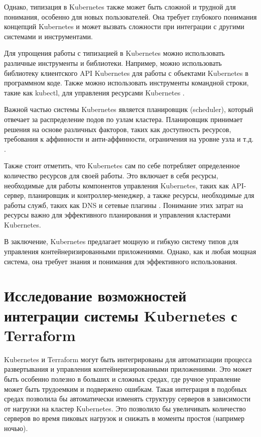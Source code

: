 Однако, типизация в Kubernetes также может быть сложной и трудной для
понимания, особенно для новых пользователей. Она требует глубокого
понимания концепций Kubernetes и может вызвать сложности при интеграции
с другими системами и инструментами.

Для упрощения работы с типизацией в Kubernetes можно использовать
различные инструменты и библиотеки. Например, можно использовать
библиотеку клиентского API \newline Kubernetes для работы с объектами Kubernetes
в программном коде. Также можно использовать инструменты командной строки,
такие как kubectl, для управления ресурсами Kubernetes \cite{kubectl}.

Важной частью системы Kubernetes является планировщик (scheduler),
который отвечает за распределение подов по узлам кластера. Планировщик
принимает решения на основе различных факторов, таких как доступность
ресурсов, требования к аффинности и анти-аффинности, ограничения на уровне
узла и т.д. \cite{carrion2022kubernetes, senjab2023survey}.

Также стоит отметить, что Kubernetes сам по себе потребляет определенное
количество ресурсов для своей работы. Это включает в себя ресурсы,
необходимые для работы компонентов управления Kubernetes, таких как
API-сервер, планировщик и контроллер-менеджер, а также ресурсы, необходимые
для работы служб, таких как DNS и сетевые плагины \cite{turin2023predicting}.
Понимание этих затрат на ресурсы важно для эффективного планирования и
управления кластерами Kubernetes.

В заключение, Kubernetes предлагает мощную и гибкую систему типов для
управления контейнеризированными приложениями. Однако, как и любая мощная
система, она требует знания и понимания для эффективного использования.

\section{Исследование возможностей интеграции системы Kubernetes с \newline
Terraform}
Kubernetes и Terraform могут быть интегрированы для автоматизации процесса
развертывания и управления контейнеризированными приложениями.
Это может быть особенно полезно в больших и сложных средах, где ручное
управление может быть трудоемким и подвержено ошибкам.
Такая интеграция в подобных средах позволила бы автоматически изменять
структуру серверов в зависимости от нагрузки на кластер Kubernetes. 
Это позволило бы увеличивать количество серверов во время пиковых нагрузок
и снижать в моменты простоя (например ночью).

